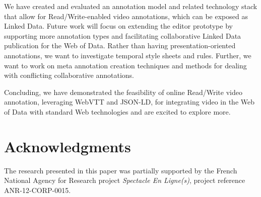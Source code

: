 \documentclass{sig-alternate}
\def\JSONLD{\mbox{JSON-LD}}
\begin{document}
We have created and evaluated an annotation model
and related technology stack
that allow for Read/Write-enabled video annotations,
which can be exposed as Linked Data.
Future work will focus on extending the editor prototype
by supporting more annotation types and
facilitating collaborative Linked Data publication
for the Web of Data.
Rather than having presentation-oriented annotations,
we want to investigate temporal style sheets and rules.
Further, we want to work on meta annotation creation techniques
and methods for dealing with conflicting collaborative annotations.

Concluding, we have demonstrated the feasibility of online
Read/Write video annotation, leveraging WebVTT
and \JSONLD, for integrating video in the Web of Data
with standard Web technologies
and are excited to explore more.

\section*{Acknowledgments}
\footnotesize
The research presented in this paper was partially supported
by the French National Agency for Research  project
\emph{Spectacle En Ligne(s)}, project reference
\mbox{ANR-12-CORP-0015}.

\normalsize


\end{document}
